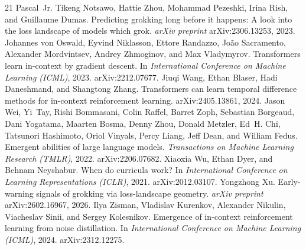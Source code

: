 \documentclass[11pt]{article}
\theoremstyle{plain}
\theoremstyle{definition}
\begin{document}
\begin{thebibliography}{21}
Pascal~Jr. {Tikeng Notsawo}, Hattie Zhou, Mohammad Pezeshki, Irina Rish, and Guillaume
  Dumas.
\newblock Predicting grokking long before it happens: A look into the loss
  landscape of models which grok.
\newblock \emph{arXiv preprint} arXiv:2306.13253, 2023.
\newblock {}
Johannes von Oswald, Eyvind Niklasson, Ettore Randazzo, Jo{\~a}o Sacramento,
  Alexander Mordvintsev, Andrey Zhmoginov, and Max Vladymyrov.
\newblock Transformers learn in-context by gradient descent.
\newblock In \emph{International Conference on Machine Learning (ICML)},
  2023. arXiv:2212.07677.
\newblock {}
Jiuqi Wang, Ethan Blaser, Hadi Daneshmand, and Shangtong Zhang.
\newblock Transformers can learn temporal difference methods for in-context
  reinforcement learning.
\newblock arXiv:2405.13861, 2024.
\newblock {}
Jason Wei, Yi~Tay, Rishi Bommasani, Colin Raffel, Barret Zoph, Sebastian
  Borgeaud, Dani Yogatama, Maarten Bosma, Denny Zhou, Donald Metzler, Ed~H.
  Chi, Tatsunori Hashimoto, Oriol Vinyals, Percy Liang, Jeff Dean, and William
  Fedus.
\newblock Emergent abilities of large language models.
\newblock \emph{Transactions on Machine Learning Research (TMLR)}, 2022.
\newblock arXiv:2206.07682.
\newblock {}
Xiaoxia Wu, Ethan Dyer, and Behnam Neyshabur.
\newblock When do curricula work?
\newblock In \emph{International Conference on Learning Representations
  (ICLR)}, 2021. arXiv:2012.03107.
\newblock {}
Yongzhong Xu.
\newblock Early-warning signals of grokking via loss-landscape geometry.
\newblock \emph{arXiv preprint} arXiv:2602.16967, 2026.
\newblock {}
Ilya Zisman, Vladislav Kurenkov, Alexander Nikulin, Viacheslav Sinii, and Sergey
  Kolesnikov.
\newblock Emergence of in-context reinforcement learning from noise
  distillation.
\newblock In \emph{International Conference on Machine Learning (ICML)}, 2024.
\newblock arXiv:2312.12275.
\newblock {}
\end{thebibliography}
\end{document}
